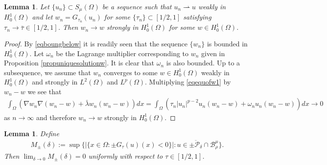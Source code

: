 \documentclass[10pt,a4paper]{article}
\newtheorem{lemma}[theorem]{Lemma}
\theoremstyle{definition} \theoremstyle{remark}
\numberwithin{equation}{section}
\newcommand{\B}{\mathcal{B}}
\newcommand{\p}{\mathcal{P}}
\newcommand{\la}{\lambda}
\begin{document}
\begin{lemma} \label{lemproG3}
	Let $\{u_n\} \subset S_\mu(\Omega)$ be a sequence such that $u_n \rightharpoonup u$ weakly in $H_0^1(\Omega)$ and let $w_n = G_{\tau_n}(u_n)$ for some $\{\tau_n\} \subset [1/2,1]$ satisfying $\tau_n \to \bar\tau \in [1/2,1]$. Then $w_n \to w$ strongly in $H_0^1(\Omega)$ for some $w \in H_0^1(\Omega)$.
\end{lemma}

\begin{proof}
	By \eqref{eqboungbelow} it is readily seen that the sequence $\{w_n\}$ is bounded in $H_0^1(\Omega)$. Let $\omega_n$ be the Lagrange multiplier corresponding to $w_n$ given in Proposition \ref{propuniquesolutionw}. It is clear that $\omega_n$ is also bounded. Up to a subsequence, we assume that $w_n$ converges to some $w \in H_0^1(\Omega)$ weakly in $H_0^1(\Omega)$ and strongly in $L^2(\Omega)$ and $L^p(\Omega)$. Multiplying \eqref{eqequofw1} by $w_n - w$ we see that
	\begin{align*}
		\int_\Omega \left( \nabla w_n \nabla (w_n-w) + \bar\la w_n(w_n-w)\right) dx = \int_\Omega\left( \tau_n|u_n|^{p-2}u_n(w_n-w) + \omega_n u_n(w_n-w)\right) dx \to 0
	\end{align*}
    as $n \to \infty$ and therefore $w_n \to w$ strongly in $H_0^1(\Omega)$.
\end{proof}

\begin{lemma} \label{lempre1}
	Define
	\begin{align}
		M_{\pm}(\delta) := \sup\bigl\{\Big|\{x \in \Omega: \pm G_\tau(u)(x) < 0\}\Big| : u \in \overline{\pm\p_\delta} \cap \B_\rho^\mu \bigr\}.
	\end{align}
    Then $\lim_{\delta \to 0}M_{\pm}(\delta) = 0$ uniformly with respect to $\tau \in [1/2,1]$.
\end{lemma}
\end{document}

